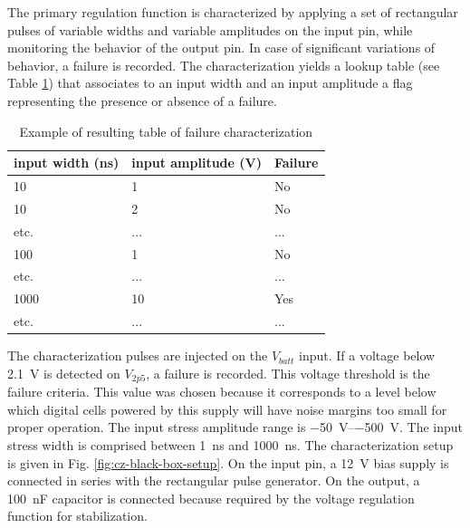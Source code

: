 The primary regulation function is characterized by applying a set of rectangular pulses of variable widths and variable amplitudes on the input pin, while monitoring the behavior of the output pin.
In case of significant variations of behavior, a failure is recorded.
The characterization yields a lookup table (see Table \ref{tab:cz-failure}) that associates to an input width and an input amplitude a flag representing the presence or absence of a failure.

\begin{table}[!h]
\centering
\begin{tabular}{@{}lll@{}}
\toprule
input width (ns) & input amplitude (V) & Failure   \\ \midrule
10               & 1                   & No        \\
10               & 2                   & No        \\
etc.             & ...                 & ...       \\
100              & 1                   & No        \\
etc.             & ...                 & ...       \\
1000             & 10                  & Yes       \\
etc.             & ...                 & ... \\ \bottomrule
\end{tabular}
\caption{Example of resulting table of failure characterization}
\label{tab:cz-failure}
\end{table}

The characterization pulses are injected on the $V_{batt}$ input.
If a voltage below \SI{2.1}{\volt} is detected on $V_{2p5}$, a failure is recorded.
This voltage threshold is the failure criteria.
This value was chosen because it corresponds to a level below which digital cells powered by this supply will have noise margins too small for proper operation.
The input stress amplitude range is \SIrange{-50}{-500}{\volt}.
The input stress width is comprised between \SI{1}{\nano\second} and \SI{1000}{\nano\second}.
The characterization setup is given in Fig. \ref{fig:cz-black-box-setup}.
On the input pin, a \SI{12}{\volt} bias supply is connected in series with the rectangular pulse generator.
On the output, a \SI{100}{\nano\farad} capacitor is connected because required by the voltage regulation function for stabilization.

